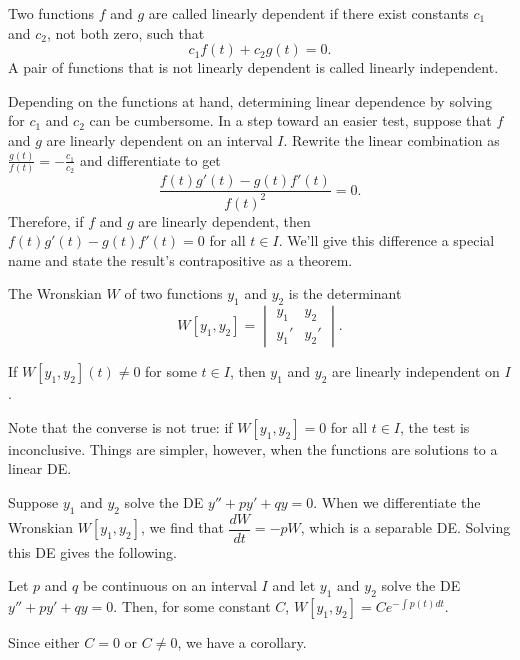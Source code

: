 \documentclass[../m82main.tex]{subfiles}
\begin{document}
\begin{definition}
    Two functions $f$ and $g$ are called linearly dependent if there exist constants $c_1$ and $c_2$, not both zero, such that
    \[ c_1f(t) + c_2g(t) = 0. \]
    A pair of functions that is not linearly dependent is called linearly independent.
\end{definition}

Depending on the functions at hand, determining linear dependence by solving for $c_1$ and $c_2$ can be cumbersome.
In a step toward an easier test, suppose that $f$ and $g$ are linearly dependent on an interval $I$.
Rewrite the linear combination as $\displaystyle \frac{g(t)}{f(t)} = -\frac{c_1}{c_2}$ and differentiate to get
\[ \frac{f(t)g'(t) - g(t)f'(t)}{f(t)^2} = 0. \]
Therefore, if $f$ and $g$ are linearly dependent, then $f(t)g'(t) - g(t)f'(t) = 0$ for all $t \in I$.
We'll give this difference a special name and state the result's contrapositive as a theorem.

\begin{definition}[Wronskian]
    The Wronskian $W$ of two functions $y_1$ and $y_2$ is the determinant
    \[ W[y_1, y_2] = \begin{vmatrix} y_1 & y_2 \\ y_1' & y_2' \end{vmatrix}. \]
\end{definition}

\begin{theorem}
    If $W[y_1, y_2](t) \neq 0$ for some $t \in I$, then $y_1$ and $y_2$ are linearly independent on $I$.
\end{theorem}

Note that the converse is not true: if $W[y_1, y_2] = 0$ for all $t \in I$, the test is inconclusive.
Things are simpler, however, when the functions are solutions to a linear DE.

Suppose $y_1$ and $y_2$ solve the DE $y'' + py' + qy = 0$.
When we differentiate the Wronskian $W[y_1, y_2]$, we find that $\dfrac{dW}{dt} = -pW$, which is a separable DE.
Solving this DE gives the following.

\begin{theorem}
    Let $p$ and $q$ be continuous on an interval $I$ and let $y_1$ and $y_2$ solve the DE $y'' + py' + qy = 0$.
    Then, for some constant $C$, $W[y_1, y_2] = Ce^{-\int p(t) dt}$.
\end{theorem}

Since either $C = 0$ or $C \neq 0$, we have a corollary.
\end{document}
